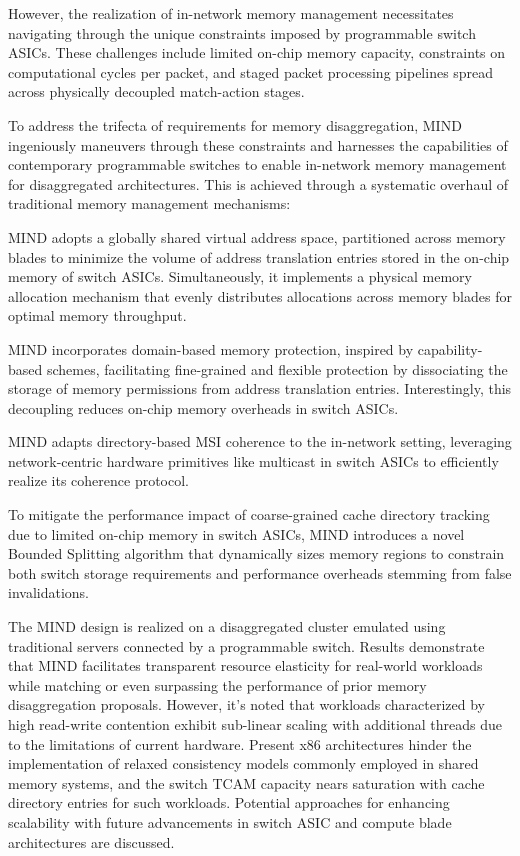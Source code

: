 However, the realization of in-network memory management necessitates navigating through the unique constraints imposed by programmable switch ASICs. These challenges include limited on-chip memory capacity, constraints on computational cycles per packet, and staged packet processing pipelines spread across physically decoupled match-action stages.

To address the trifecta of requirements for memory disaggregation, MIND ingeniously maneuvers through these constraints and harnesses the capabilities of contemporary programmable switches to enable in-network memory management for disaggregated architectures. This is achieved through a systematic overhaul of traditional memory management mechanisms:

MIND adopts a globally shared virtual address space, partitioned across memory blades to minimize the volume of address translation entries stored in the on-chip memory of switch ASICs. Simultaneously, it implements a physical memory allocation mechanism that evenly distributes allocations across memory blades for optimal memory throughput.

MIND incorporates domain-based memory protection, inspired by capability-based schemes, facilitating fine-grained and flexible protection by dissociating the storage of memory permissions from address translation entries. Interestingly, this decoupling reduces on-chip memory overheads in switch ASICs.

MIND adapts directory-based MSI coherence to the in-network setting, leveraging network-centric hardware primitives like multicast in switch ASICs to efficiently realize its coherence protocol.

To mitigate the performance impact of coarse-grained cache directory tracking due to limited on-chip memory in switch ASICs, MIND introduces a novel Bounded Splitting algorithm that dynamically sizes memory regions to constrain both switch storage requirements and performance overheads stemming from false invalidations.

The MIND design is realized on a disaggregated cluster emulated using traditional servers connected by a programmable switch. Results demonstrate that MIND facilitates transparent resource elasticity for real-world workloads while matching or even surpassing the performance of prior memory disaggregation proposals. However, it's noted that workloads characterized by high read-write contention exhibit sub-linear scaling with additional threads due to the limitations of current hardware. Present x86 architectures hinder the implementation of relaxed consistency models commonly employed in shared memory systems, and the switch TCAM capacity nears saturation with cache directory entries for such workloads. Potential approaches for enhancing scalability with future advancements in switch ASIC and compute blade architectures are discussed.
